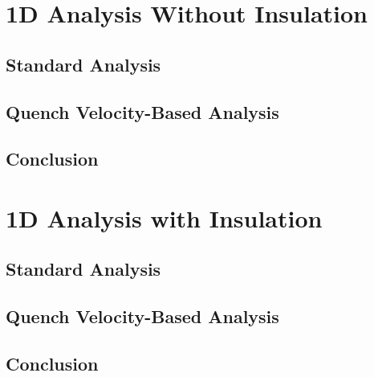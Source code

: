 \documentclass[11pt,a4paper]{report}
\begin{document}
\section{1D Analysis Without Insulation}
\label{section:quench_velocity_benchmarking_no_insulation}

\subsection{Standard Analysis}
\label{section:quench_velocity_benchmarking_no_insulation_heat_balance}


\subsection{Quench Velocity-Based Analysis}
\label{section:quench_velocity_benchmarking_no_insulation_quench_velocity}


\subsection{Conclusion}


\section{1D Analysis with Insulation}
\label{section:quench_velocity_benchmarking_with_insulation}

\subsection{Standard Analysis}
\label{section:quench_velocity_benchmarking_with_insulation_heat_balance}


\subsection{Quench Velocity-Based Analysis}
\label{section:quench_velocity_benchmarking_with_insulation_quench_velocity}


\subsection{Conclusion}

\end{document}
